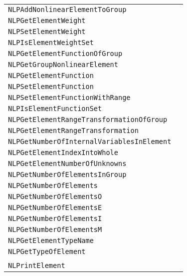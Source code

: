 \documentclass[12pt]{article}
\begin{document}
\begin{center}
\begin{tabular}{ll}
\tt NLPAddNonlinearElementToGroup&\pageref{Subroutine:NLPAddNonlinearElementToGroup}\\
\tt NLPGetElementWeight&\pageref{Subroutine:NLPGetElementWeight}\\
\tt NLPSetElementWeight&\pageref{Subroutine:NLPSetElementWeight}\\
\tt NLPIsElementWeightSet&\pageref{Subroutine:NLPIsElementWeightSet}\\
\tt NLPGetElementFunctionOfGroup&\pageref{Subroutine:NLPGetElementFunctionOfGroup}\\
\tt NLPGetGroupNonlinearElement&\pageref{Subroutine:NLPGetGroupNonlinearElement}\\
\tt NLPGetElementFunction&\pageref{Subroutine:NLPGetElementFunction}\\
\tt NLPSetElementFunction&\pageref{Subroutine:NLPSetElementFunction}\\
\tt NLPSetElementFunctionWithRange&\pageref{Subroutine:NLPSetElementFunctionWithRange}\\
\tt NLPIsElementFunctionSet&\pageref{Subroutine:NLPIsElementFunctionSet}\\
\tt NLPGetElementRangeTransformationOfGroup&\pageref{Subroutine:NLPGetElementRangeTransformationOfGroup}\\
\tt NLPGetElementRangeTransformation&\pageref{Subroutine:NLPGetElementRangeTransformation}\\
\tt NLPGetNumberOfInternalVariablesInElement&\pageref{Subroutine:NLPGetNumberOfInternalVariablesInElement}\\
\tt NLPGetElementIndexIntoWhole&\pageref{Subroutine:NLPGetElementIndexIntoWhole}\\
\tt NLPGetElementNumberOfUnknowns&\pageref{Subroutine:NLPGetElementNumberOfUnknowns}\\
\tt NLPGetNumberOfElementsInGroup&\pageref{Subroutine:NLPGetNumberOfElementsInGroup}\\
\tt NLPGetNumberOfElements&\pageref{Subroutine:NLPGetNumberOfElements}\\
\tt NLPGetNumberOfElementsO&\pageref{Subroutine:NLPGetNumberOfElementsO}\\
\tt NLPGetNumberOfElementsE&\pageref{Subroutine:NLPGetNumberOfElementsE}\\
\tt NLPGetNumberOfElementsI&\pageref{Subroutine:NLPGetNumberOfElementsI}\\
\tt NLPGetNumberOfElementsM&\pageref{Subroutine:NLPGetNumberOfElementsM}\\
\tt NLPGetElementTypeName&\pageref{Subroutine:NLPGetElementTypeName}\\
\tt NLPGetTypeOfElement&\pageref{Subroutine:NLPGetTypeOfElement}\\
\\
\tt NLPrintElement&\pageref{Subroutine:NLPrintElement}\\
\end{tabular}
\end{center}
\newpage
\end{document}
